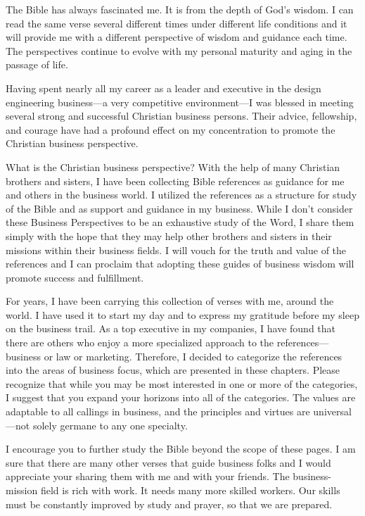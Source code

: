 \documentclass[12pt]{memoir}
\begin{document}
The Bible has always fascinated me. It is from the depth of God's
wisdom. I can read the same verse several different times under different
life conditions and it will provide me with a different perspective
of wisdom and guidance each time. The perspectives continue to evolve
with my personal maturity and aging in the passage of life.

Having spent nearly all my career as a leader and executive in the
design engineering business---a very competitive environment---I
was blessed in meeting several strong and successful Christian business
persons. Their advice, fellowship, and courage have had a profound
effect on my concentration to promote the Christian business perspective.

What is the Christian business perspective? With the help of many
Christian brothers and sisters, I have been collecting Bible references
as guidance for me and others in the business world. I utilized the
references as a structure for study of the Bible and as support and
guidance in my business. While I don't consider these Business Perspectives
to be an exhaustive study of the Word, I share them simply with the
hope that they may help other brothers and sisters in their missions
within their business fields. I will vouch for the truth and value
of the references and I can proclaim that adopting these guides of
business wisdom will promote success and fulfillment.

For years, I have been carrying this collection of verses with me,
around the world. I have used it to start my day and to express my
gratitude before my sleep on the business trail. As a top executive
in my companies, I have found that there are others who enjoy a more
specialized approach to the references---business or law or marketing.
Therefore, I decided to categorize the references into the areas of
business focus, which are presented in these chapters. Please recognize
that while you may be most interested in one or more of the categories,
I suggest that you expand your horizons into all of the categories.
The values are adaptable to all callings in business, and the principles
and virtues are universal---not solely germane to any one specialty.

I encourage you to further study the Bible beyond the scope of these
pages. I am sure that there are many other verses that guide business
folks and I would appreciate your sharing them with me and with your
friends. The business-mission field is rich with work. It needs many
more skilled workers. Our skills must be constantly improved by study
and prayer, so that we are prepared.
\end{document}
